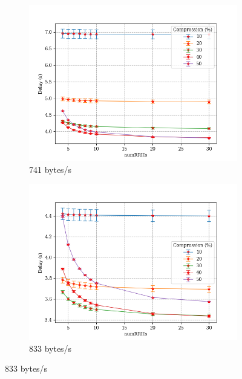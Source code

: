 \documentclass[11pt,a4paper,oneside, openright]{article}
\begin{document}
\begin{figure}[h]
\centering
\begin{subfigure}{.5\textwidth}
  \centering
  \includegraphics[width=\linewidth]{images/n-vs-delay-s-741}
  \caption{741 bytes/s}
  \label{fig:n-vs-delay-s-741}
\end{subfigure}%
\begin{subfigure}{.5\textwidth}
  \centering
  \includegraphics[width=\linewidth]{images/n-vs-delay-s-833}
  \caption{833 bytes/s}
  \label{fig:n-vs-delay-s-833}
\end{subfigure}%


\end{figure}
\end{document}

